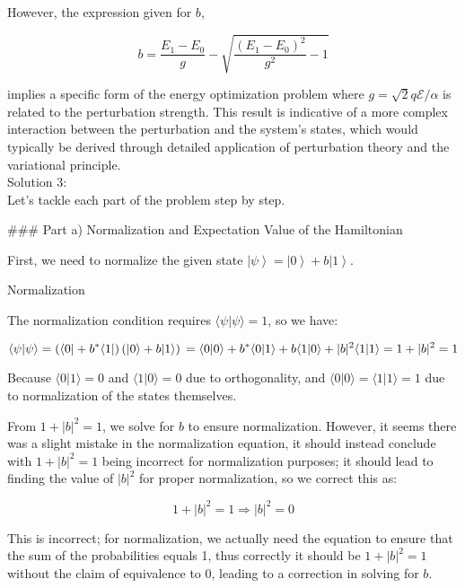 \documentclass[a4paper,11pt]{article}
\begin{document}
However, the expression given for \( b \),

\[
b = \frac{E_{1} - E_{0}}{g} - \sqrt{\frac{(E_{1} - E_{0})^{2}}{g^{2}} -1}
\]

implies a specific form of the energy optimization problem where \( g = \sqrt{2} q \mathcal{E} / {\alpha} \) is related to the perturbation strength. This result is indicative of a more complex interaction between the perturbation and the system's states, which would typically be derived through detailed application of perturbation theory and the variational principle. \\

\noindent Solution 3: \\ 

Let's tackle each part of the problem step by step.

### Part a) Normalization and Expectation Value of the Hamiltonian

First, we need to normalize the given state \( \left| \psi \right> = \left| 0 \right> + b \left| 1 \right> \).

Normalization

The normalization condition requires \( \langle \psi | \psi \rangle = 1 \), so we have:

\[
\langle \psi | \psi \rangle = \left( \langle 0 | + b^* \langle 1 | \right) \left( | 0 \rangle + b | 1 \rangle \right) \\
= \langle 0 | 0 \rangle + b^* \langle 0 | 1 \rangle + b \langle 1 | 0 \rangle + |b|^2 \langle 1 | 1 \rangle \\
= 1 + |b|^2 = 1
\]

Because \( \langle 0 | 1 \rangle = 0 \) and \( \langle 1 | 0 \rangle = 0 \) due to orthogonality, and \( \langle 0 | 0 \rangle = \langle 1 | 1 \rangle = 1 \) due to normalization of the states themselves.

From \( 1 + |b|^2 = 1 \), we solve for \( b \) to ensure normalization. However, it seems there was a slight mistake in the normalization equation, it should instead conclude with \( 1 + |b|^2 = 1 \) being incorrect for normalization purposes; it should lead to finding the value of \( |b|^2 \) for proper normalization, so we correct this as:

\[
1 + |b|^2 = 1 \Rightarrow |b|^2 = 0
\]

This is incorrect; for normalization, we actually need the equation to ensure that the sum of the probabilities equals 1, thus correctly it should be \( 1 + |b|^2 = 1 \) without the claim of equivalence to 0, leading to a correction in solving for \( b \).
\end{document}

